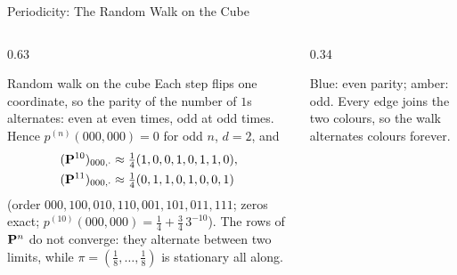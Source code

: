 \begin{frame}{Periodicity: The Random Walk on the Cube}
  \label{fr:cubeparity}
  \small
  \begin{columns}[T]
    \begin{column}{0.63\textwidth}
      \begin{exampleblock}{Random walk on the cube}
        Each step flips one coordinate, so the parity of the number of $1$s alternates: even at even times, odd at odd times. Hence $p^{(n)}(000,000)=0$ for odd $n$, $d=2$, and
        \begin{align*}
          (\mathbf{P}^{10})_{000,\cdot}&\approx\tfrac14(1,0,0,1,0,1,1,0),\\
          (\mathbf{P}^{11})_{000,\cdot}&\approx\tfrac14(0,1,1,0,1,0,0,1)
        \end{align*}
        (order $000,100,010,110,001,101,011,111$; zeros exact; $p^{(10)}(000,000)=\tfrac14+\tfrac34\,3^{-10}$). The rows of $\mathbf{P}^n$ do not converge: they alternate between two limits, while $\pi=(\tfrac18,\dots,\tfrac18)$ is stationary all along.
      \end{exampleblock}
    \end{column}
    \begin{column}{0.34\textwidth}
      \centering
      \par\smallskip
      {\footnotesize Blue: even parity; amber: odd. Every edge joins the two colours, so the walk alternates colours forever.}

\end{column}
\end{columns}
\end{frame}
